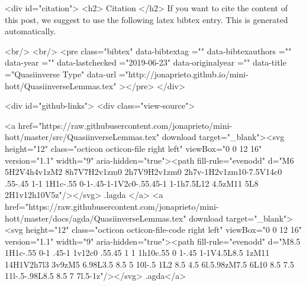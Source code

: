   
  <div id="citation">
  <h2> Citation </h2>
  If you want to cite the content of this post,
  we suggest to use the following latex bibtex entry.
  This is generated automatically.

  <br/>
  <br/>
  <pre class="bibtex"
       data-bibtextag =""
       data-bibtexauthors =""
       data-year =""
       data-lastchecked ="2019-06-23"
       data-originalyear =""
       data-title ="Quasiinverse Type"
       data-url ="http://jonaprieto.github.io/mini-hott/QuasiinverseLemmas.tex"
  ></pre>
  </div>
  

  <div id="github-links">
    <div class="view-source">
      
        <a href="https://raw.githubusercontent.com/jonaprieto/mini-hott/master/src/QuasiinverseLemmas.tex" download target="_blank"><svg height="12" class="octicon octicon-file right left" viewBox="0 0 12 16" version="1.1" width="9" aria-hidden="true"><path fill-rule="evenodd" d="M6 5H2V4h4v1zM2 8h7V7H2v1zm0 2h7V9H2v1zm0 2h7v-1H2v1zm10-7.5V14c0 .55-.45 1-1 1H1c-.55 0-1-.45-1-1V2c0-.55.45-1 1-1h7.5L12 4.5zM11 5L8 2H1v12h10V5z"/></svg> .lagda </a>
        <a href="https://raw.githubusercontent.com/jonaprieto/mini-hott/master/docs/agda/QuasiinverseLemmas.tex" download target="_blank"><svg height="12" class="octicon octicon-file-code right left" viewBox="0 0 12 16" version="1.1" width="9" aria-hidden="true"><path fill-rule="evenodd" d="M8.5 1H1c-.55 0-1 .45-1 1v12c0 .55.45 1 1 1h10c.55 0 1-.45 1-1V4.5L8.5 1zM11 14H1V2h7l3 3v9zM5 6.98L3.5 8.5 5 10l-.5 1L2 8.5 4.5 6l.5.98zM7.5 6L10 8.5 7.5 11l-.5-.98L8.5 8.5 7 7l.5-1z"/></svg> .agda</a>
      
